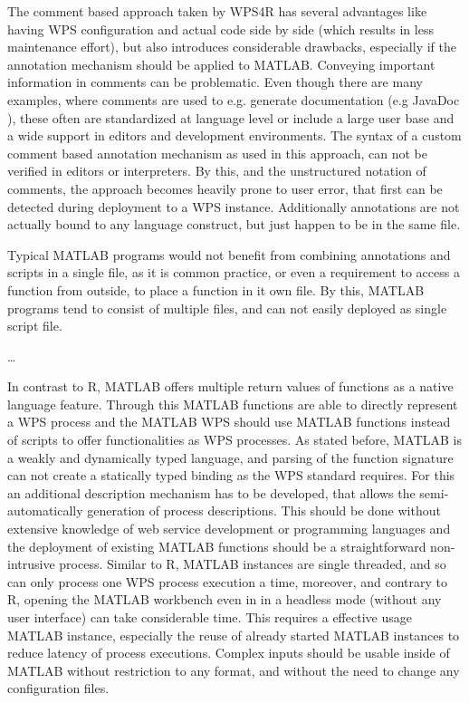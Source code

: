 	The comment based approach taken by WPS4R has several advantages like having \ac{WPS} configuration and actual code side by side (which results in less maintenance effort), but also introduces considerable drawbacks, especially if the annotation mechanism should be applied to MATLAB. Conveying important information in comments can be problematic. Even though there are many examples, where comments are used to e.g. generate documentation (e.g JavaDoc \citep{javadoc}), these often are standardized at language level or include a large user base and a wide support in editors and development environments. The syntax of a custom comment based annotation mechanism as used in this approach, can not be verified in editors or interpreters. By this, and the unstructured notation of comments, the approach becomes heavily prone to user error, that first can be detected during deployment to a WPS instance. Additionally annotations are not actually bound to any language construct, but just happen to be in the same file.

	Typical MATLAB programs would not benefit from combining annotations and scripts in a single file, as it is common practice, or even a requirement to access a function from outside, to place a function in it own file. By this, MATLAB programs tend to consist of multiple files, and can not easily deployed as single script file.

	\dots

	In contrast to R, MATLAB offers multiple return values of functions as a native language feature. Through this MATLAB functions are able to directly represent a \ac{WPS} process and the MATLAB WPS should use MATLAB functions instead of scripts to offer functionalities as WPS processes. As stated before, MATLAB is a weakly and dynamically typed language, and parsing of the function signature can not create a statically typed binding as the \ac{WPS} standard requires. For this an additional description mechanism has to be developed, that allows the semi-automatically generation of process descriptions. This should be done without extensive knowledge of web service development or programming languages and the deployment of existing MATLAB functions should be a straightforward non-intrusive process. Similar to R, MATLAB instances are single threaded, and so can only process one WPS process execution a time, moreover, and contrary to R, opening the MATLAB workbench even in in a headless mode (without any user interface) can take considerable time. This requires a effective usage MATLAB instance, especially the reuse of already started MATLAB instances to reduce latency of process executions. Complex inputs should be usable inside of MATLAB without restriction to any format, and without the need to change any configuration files.

